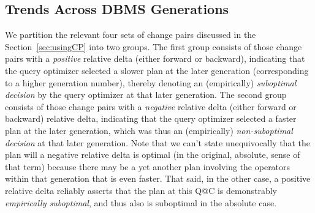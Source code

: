 \documentclass[prodmode,acmtods]{acmsmall}
\begin{document}
\subsection{Trends Across DBMS Generations}\label{sec:trends}
We partition the relevant four sets of change pairs discussed in the
Section~\ref{sec:usingCP} into two groups. The first group consists of those
change pairs with a {\em positive}
relative delta (either forward or backward), indicating that the query
optimizer selected a slower plan at the later generation (corresponding to a
higher generation number), thereby denoting an (empirically) {\em suboptimal
  decision} by the query optimizer at that later generation. The second
group consists of those change pairs 
with a {\em negative} relative delta (either forward or backward) relative
delta, indicating that the query optimizer selected a faster plan at the
later generation, which was thus an (empirically) {\em non-suboptimal
  decision} at that later generation. Note that we can't state
unequivocally that the plan will a negative relative delta is optimal (in the
original, absolute, sense of that term) because there may be a yet another
plan involving the operators 
within that generation that is even faster. That said, in the other case, a positive relative
delta reliably asserts that the plan at this Q@C is \hbox{demonstrably}
{\em empirically suboptimal}, and thus also is suboptimal in the absolute case.

\begin{table}[t]
\end{table}
\end{document}
